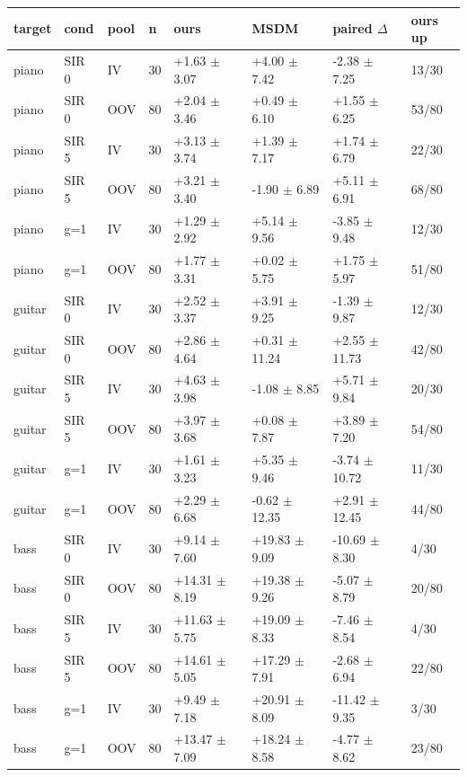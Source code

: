 \begin{tabular}{llllllll}
\toprule
target & cond & pool & n & ours & MSDM & paired $\Delta$ & ours up\\
\midrule
piano & SIR 0 & IV & 30 & +1.63 $\pm$ 3.07 & +4.00 $\pm$ 7.42 & -2.38 $\pm$ 7.25 & 13/30\\
piano & SIR 0 & OOV & 80 & +2.04 $\pm$ 3.46 & +0.49 $\pm$ 6.10 & +1.55 $\pm$ 6.25 & 53/80\\
piano & SIR 5 & IV & 30 & +3.13 $\pm$ 3.74 & +1.39 $\pm$ 7.17 & +1.74 $\pm$ 6.79 & 22/30\\
piano & SIR 5 & OOV & 80 & +3.21 $\pm$ 3.40 & -1.90 $\pm$ 6.89 & +5.11 $\pm$ 6.91 & 68/80\\
piano & g=1 & IV & 30 & +1.29 $\pm$ 2.92 & +5.14 $\pm$ 9.56 & -3.85 $\pm$ 9.48 & 12/30\\
piano & g=1 & OOV & 80 & +1.77 $\pm$ 3.31 & +0.02 $\pm$ 5.75 & +1.75 $\pm$ 5.97 & 51/80\\
guitar & SIR 0 & IV & 30 & +2.52 $\pm$ 3.37 & +3.91 $\pm$ 9.25 & -1.39 $\pm$ 9.87 & 12/30\\
guitar & SIR 0 & OOV & 80 & +2.86 $\pm$ 4.64 & +0.31 $\pm$ 11.24 & +2.55 $\pm$ 11.73 & 42/80\\
guitar & SIR 5 & IV & 30 & +4.63 $\pm$ 3.98 & -1.08 $\pm$ 8.85 & +5.71 $\pm$ 9.84 & 20/30\\
guitar & SIR 5 & OOV & 80 & +3.97 $\pm$ 3.68 & +0.08 $\pm$ 7.87 & +3.89 $\pm$ 7.20 & 54/80\\
guitar & g=1 & IV & 30 & +1.61 $\pm$ 3.23 & +5.35 $\pm$ 9.46 & -3.74 $\pm$ 10.72 & 11/30\\
guitar & g=1 & OOV & 80 & +2.29 $\pm$ 6.68 & -0.62 $\pm$ 12.35 & +2.91 $\pm$ 12.45 & 44/80\\
bass & SIR 0 & IV & 30 & +9.14 $\pm$ 7.60 & +19.83 $\pm$ 9.09 & -10.69 $\pm$ 8.30 & 4/30\\
bass & SIR 0 & OOV & 80 & +14.31 $\pm$ 8.19 & +19.38 $\pm$ 9.26 & -5.07 $\pm$ 8.79 & 20/80\\
bass & SIR 5 & IV & 30 & +11.63 $\pm$ 5.75 & +19.09 $\pm$ 8.33 & -7.46 $\pm$ 8.54 & 4/30\\
bass & SIR 5 & OOV & 80 & +14.61 $\pm$ 5.05 & +17.29 $\pm$ 7.91 & -2.68 $\pm$ 6.94 & 22/80\\
bass & g=1 & IV & 30 & +9.49 $\pm$ 7.18 & +20.91 $\pm$ 8.09 & -11.42 $\pm$ 9.35 & 3/30\\
bass & g=1 & OOV & 80 & +13.47 $\pm$ 7.09 & +18.24 $\pm$ 8.58 & -4.77 $\pm$ 8.62 & 23/80\\

\end{tabular}

